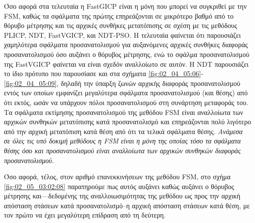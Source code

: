 Όσο αφορά στα τελευταία η FastGICP είναι η μόνη που μπορεί να συγκριθεί με την
FSM, καθώς τα σφάλματα της πρώτης επηρεάζονται σε μικρότερο βαθμό από το θόρυβο
μέτρησης και τις αρχικές συνθήκες μετατόπισης σε σχέση με τις μεθόδους PLICP,
NDT, FastVGICP, και NDT-PSO. Η τελευταία φαίνεται ότι παρουσιάζει χαμηλότερα
σφάλματα προσανατολισμού για αυξανόμενες αρχικές συνθήκες διαφοράς
προσανατολισμού όσο αυξάνει ο θόρυβος μέτρησης, ενώ το σφάλμα προσανατολισμού
της FastVGICP φαίνεται να είναι σχεδόν αναλλοίωτο σε αυτόν. Η NDT παρουσιάζει
το ίδιο πρότυπο που παρουσίασε και στα σχήματα
\ref{fig:02_04_05:06}-\ref{fig:02_04_05:09}, δηλαδή την ύπαρξη ζωνών αρχικής
διαφοράς προσανατολισμού εντός των οποίων εμφανίζει μεγαλύτερα σφάλματα
προσανατολισμού (και θέσης) από ότι εκτός, ωσάν να υπάρχουν πόλοι
προσανατολισμού στη συνάρτηση μεταφοράς του. Τα σφάλματα εκτίμησης
προσανατολισμού της μεθόδου FSM είναι αναλλοίωτα των αρχικών συνθηκών
μετατόπισης κατά προσανατολισμό και επηρεάζονται πολύ λιγότερο από την αρχική
μετατόπιση κατά θέση από ότι τα τελικά σφάλματα θέσης. \textit{Ανάμεσα σε όλες
τις υπό δοκιμή μεθόδους η FSM είναι η μόνη της οποίας τόσο τα σφάλματα θέσης
όσο και προσανατολισμού είναι αναλλοίωτα των αρχικών συνθηκών διαφοράς
προσανατολισμού}.

Όσο αφορά, τέλος, στον αριθμό επανεκκινήσεων της μεθόδου FSM, στο σχήμα
\ref{fig:02_05_03:02:08} παρατηρούμε πως αυτός αυξάνει καθώς αυξάνει ο θόρυβος
μέτρησης και---δεδομένης της αναλλοιωσιμότητας της μεθόδου ως προς την αρχική
απόσταση στάσεων κατά προσανατολισμό--η αρχική απόσταση στάσεων κατά θέση,
με τον πρώτο να έχει μεγαλύτερη επίδραση από τη δεύτερη.
